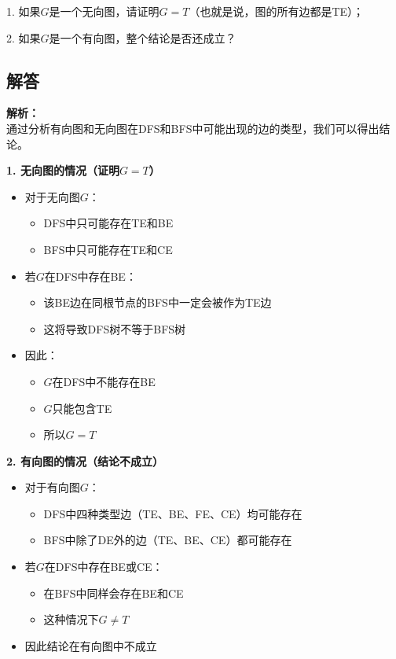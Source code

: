 \documentclass{article}
\begin{document}
1. 如果$G$是一个无向图，请证明$G=T$（也就是说，图的所有边都是TE）；

2. 如果$G$是一个有向图，整个结论是否还成立？

\subsection{解答}

\noindent\textbf{解析：}\\
通过分析有向图和无向图在DFS和BFS中可能出现的边的类型，我们可以得出结论。

\noindent\textbf{1. 无向图的情况（证明$G=T$）}
\begin{itemize}
    \item 对于无向图$G$：
    \begin{itemize}
        \item DFS中只可能存在TE和BE
        \item BFS中只可能存在TE和CE
    \end{itemize}
    
    \item 若$G$在DFS中存在BE：
    \begin{itemize}
        \item 该BE边在同根节点的BFS中一定会被作为TE边
        \item 这将导致DFS树不等于BFS树
    \end{itemize}
    
    \item 因此：
    \begin{itemize}
        \item $G$在DFS中不能存在BE
        \item $G$只能包含TE
        \item 所以$G = T$
    \end{itemize}
\end{itemize}

\noindent\textbf{2. 有向图的情况（结论不成立）}
\begin{itemize}
    \item 对于有向图$G$：
    \begin{itemize}
        \item DFS中四种类型边（TE、BE、FE、CE）均可能存在
        \item BFS中除了DE外的边（TE、BE、CE）都可能存在
    \end{itemize}
    
    \item 若$G$在DFS中存在BE或CE：
    \begin{itemize}
        \item 在BFS中同样会存在BE和CE
        \item 这种情况下$G \neq T$
    \end{itemize}
    
    \item 因此结论在有向图中不成立
\end{itemize}

\pagebreak
\end{document}
